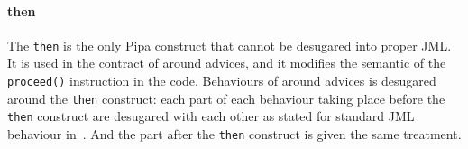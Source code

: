 \paragraph{then}
The {\tt then} is the only Pipa construct that cannot be desugared
into proper JML. It is used in the contract of around advices, and it
modifies the semantic of the {\tt proceed()} instruction in the code.
Behaviours of around advices is desugared around the {\tt then}
construct: each part of each behaviour taking place before the {\tt
then} construct are desugared with each other as stated for standard
JML behaviour in~\cite{clifton02spectators}.  And the part after the
{\tt then} construct is given the same treatment.

